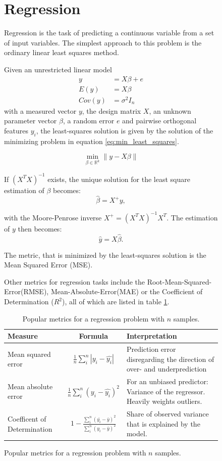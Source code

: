 \begin{figure}
\section{Regression}
Regression is the task of predicting a continuous variable
from a set of input variables.
The simplest approach
to this problem is the ordinary linear least squares method.

Given an unrestricted linear model
\begin{align}
	y &= X\beta + e \\
	E(y) &= X\beta \\
	Cov(y) &= \sigma^2 I_n
\end{align}
with a measured vector $y$, the design matrix $X$,
an unknown parameter vector $\beta$, a random error $e$
and pairwise orthogonal features $y_i$,
the least-squares solution is given by the solution of
the minimizing problem in equation \ref{eq:min_least_squares}.

\begin{equation}
	\min_{\beta\in\mathbb{R}^k} \lVert y - X\beta \rVert
	\label{eq:min_least_squares}
\end{equation}

If $(X^TX)^{-1}$ exists, the unique solution for the
least square estimation of $\beta$ becomes:
\begin{equation}
	\hat{\beta} = X^+ y,
\end{equation}

with the Moore-Penrose inverse $X^+ = (X^TX)^{-1}X^T$.
The estimation of $y$ then becomes:
\begin{equation}
  \hat{y} = X\hat{\beta}.
\end{equation}

The metric, that is minimized by the least-squares solution
is the Mean Squared Error (MSE).

Other metrics for regression tasks include the
Root-Mean-Squared-Error(RMSE),
Mean-Absolute-Error(MAE)
or the Coefficient of Determination ($R^2$), all of which are listed in table
\ref{tab:regr_metrics}.

\begin{table}
  \caption{Popular metrics for a regression problem with $n$ samples.}
  \begin{center}
    \begin{tabularx}{\textwidth}{l c X}
      Measure & Formula & Interpretation \\
      \hline
      Mean squared error & $\frac{1}{n}\sum_i^n |y_i-\hat{y_i}|$ & Prediction error disregarding the direction of over- and underprediction \\
      Mean absolute error & $\frac{1}{n}\sum_i^n (y_i-\hat{y_i})^2$ & For an unbiased predictor: Variance of the regressor. Heavily weights outliers. \\
      Coefficent of Determination & $1 - \frac{\sum_i^n (\bar{y_i}-\bar{y})^2}{\sum_i^n (y_i-\bar{y})^2}$ & Share of observed variance that is explained by the model.\\
    \end{tabularx}
  \end{center}
  \label{tab:regr_metrics}
\end{table}


\end{figure}
